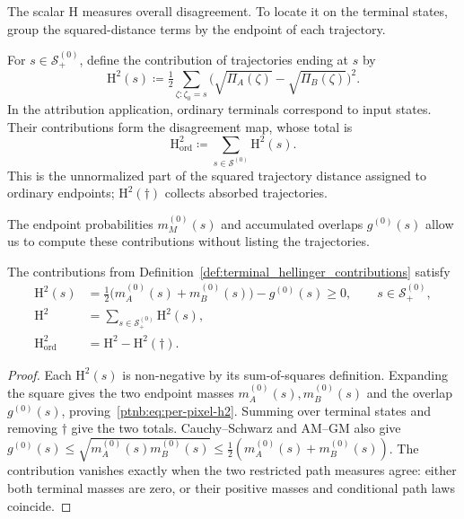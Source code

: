 The scalar $\mathrm H$ measures overall disagreement. To locate it on the terminal states, group the squared-distance terms by the endpoint of each trajectory.
\begin{definition}\label{def:terminal_hellinger_contributions}
For $s\in\mathcal S_+^{(0)}$, define the contribution of trajectories ending at $s$ by
\[
 \mathrm H^2(s)\coloneqq\tfrac12\sum_{\zeta:\zeta_0=s}
 \bigl(\sqrt{\Pi_A(\zeta)}-\sqrt{\Pi_B(\zeta)}\bigr)^2.
\]
In the attribution application, ordinary terminals correspond to input states. Their contributions form the disagreement map, whose total is
\[
 \mathrm H_{\mathrm{ord}}^2\coloneqq\sum_{s\in\mathcal S^{(0)}}\mathrm H^2(s).
\]
This is the unnormalized part of the squared trajectory distance assigned to ordinary endpoints; $\mathrm H^2(\dagger)$ collects absorbed trajectories.
\end{definition}

The endpoint probabilities $m_M^{(0)}(s)$ and accumulated overlaps $g^{(0)}(s)$ allow us to compute these contributions without listing the trajectories.

\begin{theoremenv}\label{ptnb:thm:per-pixel}
The contributions from Definition~\ref{def:terminal_hellinger_contributions} satisfy
\begin{align}
 \mathrm H^2(s)&=\tfrac12\bigl(m_A^{(0)}(s)+m_B^{(0)}(s)\bigr)-g^{(0)}(s)\ge0,
 \qquad s\in\mathcal S_+^{(0)},\label{ptnb:eq:per-pixel-h2}\\
 \mathrm H^2&=\sum_{s\in\mathcal S_+^{(0)}}\mathrm H^2(s),\label{ptnb:eq:per-pixel-sum}\\
 \mathrm H^2_{\mathrm{ord}}&=\mathrm H^2-\mathrm H^2(\dagger).\label{ptnb:eq:ordinary-h2}
\end{align}
\end{theoremenv}

\begin{proof}
Each $\mathrm H^2(s)$ is non-negative by its sum-of-squares definition. Expanding the square gives the two endpoint masses $m_A^{(0)}(s),m_B^{(0)}(s)$ and the overlap $g^{(0)}(s)$, proving~\eqref{ptnb:eq:per-pixel-h2}. Summing over terminal states and removing $\dagger$ give the two totals. Cauchy--Schwarz and AM--GM also give
$g^{(0)}(s)\le\sqrt{m_A^{(0)}(s)m_B^{(0)}(s)}\le\tfrac12(m_A^{(0)}(s)+m_B^{(0)}(s))$.
The contribution vanishes exactly when the two restricted path measures agree: either both terminal masses are zero, or their positive masses and conditional path laws coincide.
\end{proof}


